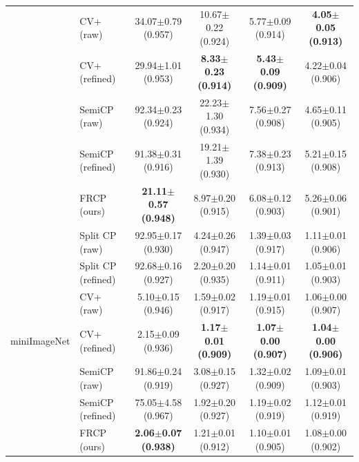 \begin{table}[t]
\begin{tabular}{llcccc}
 & CV+ (raw) & 34.07$\pm$0.79 {\scriptsize(0.957)} & 10.67$\pm$0.22 {\scriptsize(0.924)} & 5.77$\pm$0.09 {\scriptsize(0.914)} & \textbf{4.05$\pm$0.05 {\scriptsize(0.913)}}\\
 & CV+ (refined) & 29.94$\pm$1.01 {\scriptsize(0.953)} & \textbf{8.33$\pm$0.23 {\scriptsize(0.914)}} & \textbf{5.43$\pm$0.09 {\scriptsize(0.909)}} & 4.22$\pm$0.04 {\scriptsize(0.906)}\\
 & SemiCP (raw) & 92.34$\pm$0.23 {\scriptsize(0.924)} & 22.23$\pm$1.30 {\scriptsize(0.934)} & 7.56$\pm$0.27 {\scriptsize(0.908)} & 4.65$\pm$0.11 {\scriptsize(0.905)}\\
 & SemiCP (refined) & 91.38$\pm$0.31 {\scriptsize(0.916)} & 19.21$\pm$1.39 {\scriptsize(0.930)} & 7.38$\pm$0.23 {\scriptsize(0.913)} & 5.21$\pm$0.15 {\scriptsize(0.908)}\\
 & FRCP (ours) & \textbf{21.11$\pm$0.57 {\scriptsize(0.948)}} & 8.97$\pm$0.20 {\scriptsize(0.915)} & 6.08$\pm$0.12 {\scriptsize(0.903)} & 5.26$\pm$0.06 {\scriptsize(0.901)}\\
\midrule
\multirow{7}{*}{miniImageNet} & Split CP (raw) & 92.95$\pm$0.17 {\scriptsize(0.930)} & 4.24$\pm$0.26 {\scriptsize(0.947)} & 1.39$\pm$0.03 {\scriptsize(0.917)} & 1.11$\pm$0.01 {\scriptsize(0.906)}\\
 & Split CP (refined) & 92.68$\pm$0.16 {\scriptsize(0.927)} & 2.20$\pm$0.20 {\scriptsize(0.935)} & 1.14$\pm$0.01 {\scriptsize(0.911)} & 1.05$\pm$0.01 {\scriptsize(0.903)}\\
 & CV+ (raw) & 5.10$\pm$0.15 {\scriptsize(0.946)} & 1.59$\pm$0.02 {\scriptsize(0.917)} & 1.19$\pm$0.01 {\scriptsize(0.915)} & 1.06$\pm$0.00 {\scriptsize(0.907)}\\
 & CV+ (refined) & 2.15$\pm$0.09 {\scriptsize(0.936)} & \textbf{1.17$\pm$0.01 {\scriptsize(0.909)}} & \textbf{1.07$\pm$0.00 {\scriptsize(0.907)}} & \textbf{1.04$\pm$0.00 {\scriptsize(0.906)}}\\
 & SemiCP (raw) & 91.86$\pm$0.24 {\scriptsize(0.919)} & 3.08$\pm$0.15 {\scriptsize(0.927)} & 1.32$\pm$0.02 {\scriptsize(0.909)} & 1.09$\pm$0.01 {\scriptsize(0.903)}\\
 & SemiCP (refined) & 75.05$\pm$4.58 {\scriptsize(0.967)} & 1.92$\pm$0.20 {\scriptsize(0.927)} & 1.19$\pm$0.02 {\scriptsize(0.919)} & 1.12$\pm$0.01 {\scriptsize(0.919)}\\
 & FRCP (ours) & \textbf{2.06$\pm$0.07 {\scriptsize(0.938)}} & 1.21$\pm$0.01 {\scriptsize(0.912)} & 1.10$\pm$0.01 {\scriptsize(0.905)} & 1.08$\pm$0.00 {\scriptsize(0.902)}\\

\end{tabular}
\end{table}
